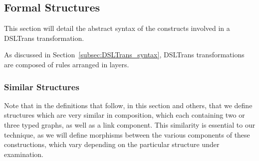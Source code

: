 %
%


\subsection{Formal Structures}



This section will detail the abstract syntax of the constructs involved in a DSLTrans transformation.

As discussed in Section~\ref{subsec:DSLTrans_syntax}, DSLTrans transformations are composed of rules arranged in layers.

\subsubsection{Similar Structures}

Note that in the definitions that follow, in this section and others, that we define structures which are very similar in composition, which each containing two or three typed graphs, as well as a link component. This similarity is essential to our technique, as we will define morphisms between the various components of these constructions, which vary depending on the particular structure under examination.

